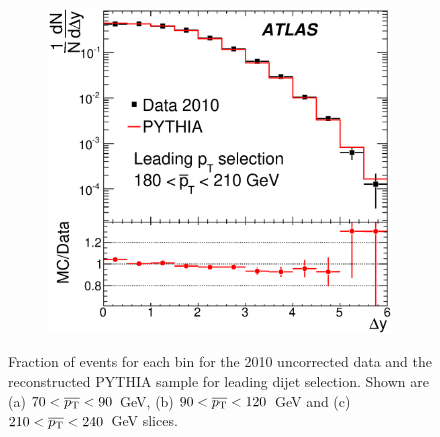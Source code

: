 \begin{figure}
        \begin{subfigure}[b]{0.5\textwidth}
                \centering
                \includegraphics[width=\textwidth]{figures/GBJ1/UncorrectedData/Inclusive_selA_Ave_pT_180_210_Norm.eps}
        \end{subfigure}%

\caption[Comparison of the inclusive distribution versus \dy{} between the data and the reconstructed PYTHIA sample for the leading \pt{} dijet selection]{
Fraction of events for each \dy{} bin for the 2010 uncorrected data and the reconstructed PYTHIA sample for leading \pt{} dijet selection. 
Shown are (a) $70<\mbox{$\overline{p_{\rm T}}$}{}<90$~GeV, (b) $90<\mbox{$\overline{p_{\rm T}}$}{}<120$~GeV and (c) $210<\mbox{$\overline{p_{\rm T}}$}{}<240$~GeV slices.
\label{UncorrIncl_dy}}
\end{figure}

